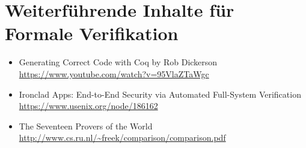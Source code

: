 \section{Weiterführende Inhalte für Formale Verifikation}
\label{a:somelabel}

\begin{itemize}
	\item Generating Correct Code with Coq by Rob Dickerson \url{https://www.youtube.com/watch?v=95VlaZTaWgc}
	\item Ironclad Apps: End-to-End Security via Automated Full-System Verification \url{https://www.usenix.org/node/186162}
	\item The Seventeen Provers of the World \url{http://www.cs.ru.nl/~freek/comparison/comparison.pdf}
\end{itemize} 

